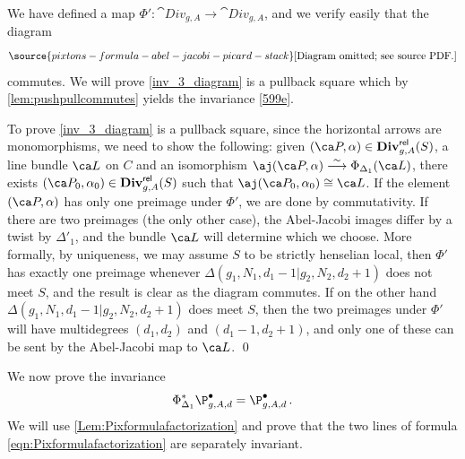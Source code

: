 We have defined a map $\Phi'\colon\cat{Div}_{g,A} \to \cat{Div}_{g,A}$, and we verify easily that the diagram
\begin{equation}\label{inv_3_diagram}
\source{pixtons-formula-abel-jacobi-picard-stack}
 \text{[Diagram omitted; see source PDF.]}
\end{equation}
commutes. We will prove \cref{inv_3_diagram} is a pullback square
which by \cref{lem:pushpullcommutes} yields the invariance \eqref{599e}.

To prove  \cref{inv_3_diagram} is a pullback square, since the horizontal arrows are monomorphisms,
we need to show the following: given $(\ca P, \alpha) \in \cat{Div}^{\rel}_{g,A}(S)$, a line bundle $\ca L$ on $C$ and an isomorphism $\aj(\ca P, \alpha) \isom \Phi_{\Delta_1}(\ca L)$, there exists $(\ca P_0, \alpha_0) \in \cat{Div}^{\rel}_{g,A}(S)$ such that $\aj(\ca P_0, \alpha_0) \cong \ca L$.  If the element $(\ca P, \alpha)$ has only one preimage under $\Phi'$, we are done by commutativity. If there are two preimages (the only other case), the  Abel-Jacobi images differ by a twist by $\Delta'_1$, and the bundle $\ca L$ will determine which we choose. More formally, by uniqueness, we may assume $S$ to be strictly henselian local, then $\Phi'$ has exactly one preimage whenever $\Delta(g_1,N_1,d_1-1|g_2,N_2,d_2+1)$ does not meet $S$, and the result is clear as the diagram commutes. If on the other hand $\Delta(g_1,N_1,d_1-1|g_2,N_2,d_2+1)$ does meet $S$, then the two preimages under $\Phi'$ will have multidegrees $(d_1,d_2)$ and $(d_1-1,d_2+1)$, and only one of these can be sent by the Abel-Jacobi map to $\ca L$. \qed





We now prove the invariance
\[\Phi_{\Delta_1}^* \P_{g,A,d}^\bullet = \P_{g,A,d}^\bullet\, .\]
We will use \cref{Lem:Pixformulafactorization} and prove that the two lines of formula \eqref{eqn:Pixformulafactorization} are separately
invariant.

